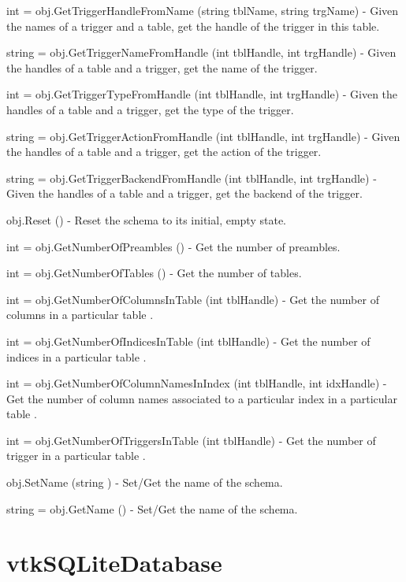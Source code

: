 \begin{DoxyItemize}
\item {\ttfamily int = obj.\-Get\-Trigger\-Handle\-From\-Name (string tbl\-Name, string trg\-Name)} -\/ Given the names of a trigger and a table, get the handle of the trigger in this table.  
\item {\ttfamily string = obj.\-Get\-Trigger\-Name\-From\-Handle (int tbl\-Handle, int trg\-Handle)} -\/ Given the handles of a table and a trigger, get the name of the trigger.  
\item {\ttfamily int = obj.\-Get\-Trigger\-Type\-From\-Handle (int tbl\-Handle, int trg\-Handle)} -\/ Given the handles of a table and a trigger, get the type of the trigger.  
\item {\ttfamily string = obj.\-Get\-Trigger\-Action\-From\-Handle (int tbl\-Handle, int trg\-Handle)} -\/ Given the handles of a table and a trigger, get the action of the trigger.  
\item {\ttfamily string = obj.\-Get\-Trigger\-Backend\-From\-Handle (int tbl\-Handle, int trg\-Handle)} -\/ Given the handles of a table and a trigger, get the backend of the trigger.  
\item {\ttfamily obj.\-Reset ()} -\/ Reset the schema to its initial, empty state.  
\item {\ttfamily int = obj.\-Get\-Number\-Of\-Preambles ()} -\/ Get the number of preambles.  
\item {\ttfamily int = obj.\-Get\-Number\-Of\-Tables ()} -\/ Get the number of tables.  
\item {\ttfamily int = obj.\-Get\-Number\-Of\-Columns\-In\-Table (int tbl\-Handle)} -\/ Get the number of columns in a particular table .  
\item {\ttfamily int = obj.\-Get\-Number\-Of\-Indices\-In\-Table (int tbl\-Handle)} -\/ Get the number of indices in a particular table .  
\item {\ttfamily int = obj.\-Get\-Number\-Of\-Column\-Names\-In\-Index (int tbl\-Handle, int idx\-Handle)} -\/ Get the number of column names associated to a particular index in a particular table .  
\item {\ttfamily int = obj.\-Get\-Number\-Of\-Triggers\-In\-Table (int tbl\-Handle)} -\/ Get the number of trigger in a particular table .  
\item {\ttfamily obj.\-Set\-Name (string )} -\/ Set/\-Get the name of the schema.  
\item {\ttfamily string = obj.\-Get\-Name ()} -\/ Set/\-Get the name of the schema.  
\end{DoxyItemize}\hypertarget{vtkio_vtksqlitedatabase}{}\section{vtk\-S\-Q\-Lite\-Database}\label{vtkio_vtksqlitedatabase}
